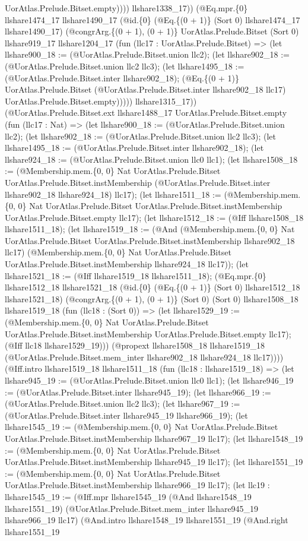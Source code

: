 \documentclass[11pt]{article}
\begin{document}
UorAtlas.Prelude.Bitset.empty)))) llshare1338\_17)) (@Eq.mpr.\{0\} llshare1474\_17 llshare1490\_17 (@id.\{0\} (@Eq.\{(0 + 1)\} (Sort 0) llshare1474\_17 llshare1490\_17) (@congrArg.\{(0 + 1), (0 + 1)\} UorAtlas.Prelude.Bitset (Sort 0) llshare919\_17 llshare1204\_17 (fun (llc17 : UorAtlas.Prelude.Bitset) => (let llshare900\_18 := (@UorAtlas.Prelude.Bitset.union llc2); (let llshare902\_18 := (@UorAtlas.Prelude.Bitset.union llc2 llc3); (let llshare1495\_18 := (@UorAtlas.Prelude.Bitset.inter llshare902\_18); (@Eq.\{(0 + 1)\} UorAtlas.Prelude.Bitset (@UorAtlas.Prelude.Bitset.inter llshare902\_18 llc17) UorAtlas.Prelude.Bitset.empty))))) llshare1315\_17)) (@UorAtlas.Prelude.Bitset.ext llshare1488\_17 UorAtlas.Prelude.Bitset.empty (fun (llc17 : Nat) => (let llshare900\_18 := (@UorAtlas.Prelude.Bitset.union llc2); (let llshare902\_18 := (@UorAtlas.Prelude.Bitset.union llc2 llc3); (let llshare1495\_18 := (@UorAtlas.Prelude.Bitset.inter llshare902\_18); (let llshare924\_18 := (@UorAtlas.Prelude.Bitset.union llc0 llc1); (let llshare1508\_18 := (@Membership.mem.\{0, 0\} Nat UorAtlas.Prelude.Bitset UorAtlas.Prelude.Bitset.instMembership (@UorAtlas.Prelude.Bitset.inter llshare902\_18 llshare924\_18) llc17); (let llshare1511\_18 := (@Membership.mem.\{0, 0\} Nat UorAtlas.Prelude.Bitset UorAtlas.Prelude.Bitset.instMembership UorAtlas.Prelude.Bitset.empty llc17); (let llshare1512\_18 := (@Iff llshare1508\_18 llshare1511\_18); (let llshare1519\_18 := (@And (@Membership.mem.\{0, 0\} Nat UorAtlas.Prelude.Bitset UorAtlas.Prelude.Bitset.instMembership llshare902\_18 llc17) (@Membership.mem.\{0, 0\} Nat UorAtlas.Prelude.Bitset UorAtlas.Prelude.Bitset.instMembership llshare924\_18 llc17)); (let llshare1521\_18 := (@Iff llshare1519\_18 llshare1511\_18); (@Eq.mpr.\{0\} llshare1512\_18 llshare1521\_18 (@id.\{0\} (@Eq.\{(0 + 1)\} (Sort 0) llshare1512\_18 llshare1521\_18) (@congrArg.\{(0 + 1), (0 + 1)\} (Sort 0) (Sort 0) llshare1508\_18 llshare1519\_18 (fun (llc18 : (Sort 0)) => (let llshare1529\_19 := (@Membership.mem.\{0, 0\} Nat UorAtlas.Prelude.Bitset UorAtlas.Prelude.Bitset.instMembership UorAtlas.Prelude.Bitset.empty llc17); (@Iff llc18 llshare1529\_19))) (@propext llshare1508\_18 llshare1519\_18 (@UorAtlas.Prelude.Bitset.mem\_inter llshare902\_18 llshare924\_18 llc17)))) (@Iff.intro llshare1519\_18 llshare1511\_18 (fun (llc18 : llshare1519\_18) => (let llshare945\_19 := (@UorAtlas.Prelude.Bitset.union llc0 llc1); (let llshare946\_19 := (@UorAtlas.Prelude.Bitset.inter llshare945\_19); (let llshare966\_19 := (@UorAtlas.Prelude.Bitset.union llc2 llc3); (let llshare967\_19 := (@UorAtlas.Prelude.Bitset.inter llshare945\_19 llshare966\_19); (let llshare1545\_19 := (@Membership.mem.\{0, 0\} Nat UorAtlas.Prelude.Bitset UorAtlas.Prelude.Bitset.instMembership llshare967\_19 llc17); (let llshare1548\_19 := (@Membership.mem.\{0, 0\} Nat UorAtlas.Prelude.Bitset UorAtlas.Prelude.Bitset.instMembership llshare945\_19 llc17); (let llshare1551\_19 := (@Membership.mem.\{0, 0\} Nat UorAtlas.Prelude.Bitset UorAtlas.Prelude.Bitset.instMembership llshare966\_19 llc17); (let llc19 : llshare1545\_19 := (@Iff.mpr llshare1545\_19 (@And llshare1548\_19 llshare1551\_19) (@UorAtlas.Prelude.Bitset.mem\_inter llshare945\_19 llshare966\_19 llc17) (@And.intro llshare1548\_19 llshare1551\_19 (@And.right llshare1551\_19 
\end{document}
